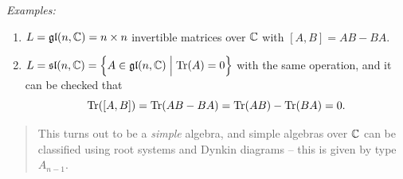 \emph{Examples:}

\begin{enumerate}
\def\labelenumi{\arabic{enumi}.}
\item
  \(L = {\mathfrak{gl}}(n, {\mathbb{C}}) = n \times n\) invertible matrices over \({\mathbb{C}}\)
  with \([A, B] = AB - BA\).
\item
  \(L = {\mathfrak{sl}}(n, {\mathbb{C}}) = \left\{{A \in {\mathfrak{gl}}(n, {\mathbb{C}}) \mathrel{\Big|} \mathrm{Tr}(A) = 0}\right\}\)
  with the same operation, and it can be checked that \[
  \mathrm{Tr}([A, B]) = \mathrm{Tr}(AB - BA) = \mathrm{Tr}(AB) - \mathrm{Tr}(BA) = 0
  .\]
\end{enumerate}

\begin{quote}
This turns out to be a \emph{simple} algebra, and simple algebras over
\({\mathbb{C}}\) can be classified using root systems and Dynkin diagrams -- this
is given by type \(A_{n-1}\).
\end{quote}





